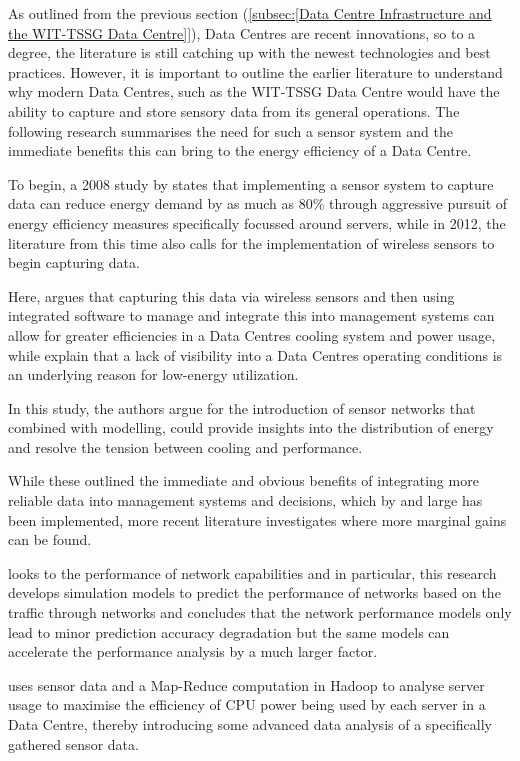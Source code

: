 \documentclass[12pt]{scrartcl}
\begin{document}
As outlined from the previous section (\ref{subsec:[Data Centre Infrastructure and the WIT-TSSG Data Centre]}), Data Centres are recent innovations, so to a degree, the literature is still catching up with the newest technologies and best practices. However, it is important to outline the earlier literature to understand why modern Data Centres, such as the WIT-TSSG Data Centre would have the ability to capture and store sensory data from its general operations. The following research summarises the need for such a sensor system and the immediate benefits this can bring to the energy efficiency of a Data Centre.   

To begin, a 2008 study by \citet{edsbas.A50BA51A20120101} states that implementing a sensor system to capture data can reduce energy demand by as much as 80\% through aggressive pursuit of energy efficiency measures specifically focussed around servers, while in 2012, the literature from this time also calls for the implementation of wireless sensors to begin capturing data. 

Here, \citet{edssch.qt9c84f49g20130101} argues that capturing this data via wireless sensors and then using integrated software to manage and integrate this into management systems can allow for greater efficiencies in a Data Centres cooling system and power usage, while \citet{edsjsr.4134817120120101} explain that a lack of visibility into a Data Centres operating conditions is an underlying reason for low-energy utilization. 

In this study, the authors argue for the introduction of sensor networks that combined with modelling, could provide insights into the distribution of energy and resolve the tension between cooling and performance.    

While these outlined the immediate and obvious benefits of integrating more reliable data into management systems and decisions, which by and large has been implemented, more recent literature investigates where more marginal gains can be found.  

\citet{edsdoj.47fdd5c4e23a43e3aa37ddd2fb75d82b20160101} looks to the performance of network capabilities and in particular, this research develops simulation models to predict the performance of networks based on the traffic through networks and concludes that the network performance models only lead to minor prediction accuracy degradation but the same models can accelerate the performance analysis by a much larger factor.  

\citet{edsarx.1402.080420140101} uses sensor data and a Map-Reduce computation in Hadoop to analyse server usage to maximise the efficiency of CPU power being used by each server in a Data Centre, thereby introducing some advanced data analysis of a specifically gathered sensor data. 
\end{document}
